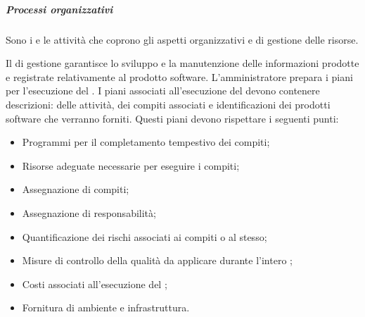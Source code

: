 \subparagraph{Processi organizzativi}
Sono i  e le attività che coprono gli aspetti organizzativi e di gestione delle risorse.

\hbox{}
Il  di gestione garantisce lo sviluppo e la manutenzione delle informazioni prodotte e registrate relativamente 
al prodotto software. L'amministratore prepara i piani per l'esecuzione del .
I piani associati all'esecuzione del  devono contenere descrizioni: delle attività, dei compiti associati e
identificazioni dei prodotti software che verranno forniti. Questi piani devono rispettare i seguenti punti:
\begin{itemize}
    \item Programmi per il completamento tempestivo dei compiti;
    \item Risorse adeguate necessarie per eseguire i compiti;
    \item Assegnazione di compiti;
    \item Assegnazione di responsabilità;
    \item Quantificazione dei rischi associati ai compiti o al  stesso;
    \item Misure di controllo della qualità da applicare durante l'intero ;
    \item Costi associati all'esecuzione del ;
    \item Fornitura di ambiente e infrastruttura.
\end{itemize}
